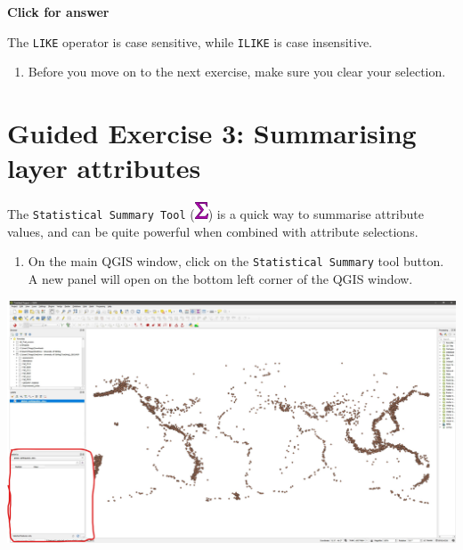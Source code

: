 \documentclass[
  letterpaper,
  DIV=11,
  numbers=noendperiod]{scrreprt}
\providecommand{\tightlist}{%
  \setlength{\itemsep}{0pt}\setlength{\parskip}{0pt}}\usepackage{longtable,booktabs,array}
\begin{document}
\begin{tcolorbox}[enhanced jigsaw, toprule=.15mm, breakable, left=2mm, colframe=quarto-callout-important-color-frame, colback=white, arc=.35mm, leftrule=.75mm, opacityback=0, rightrule=.15mm, bottomrule=.15mm]

\vspace{-3mm}\textbf{Click for answer}\vspace{3mm}

The \texttt{LIKE} operator is case sensitive, while \texttt{ILIKE} is
case insensitive.

\end{tcolorbox}

\begin{enumerate}
\def\labelenumi{(\arabic{enumi})}
\setcounter{enumi}{90}
\tightlist
\item
  Before you move on to the next exercise, make sure you clear your
  selection.
\end{enumerate}

\section{Guided Exercise 3: Summarising layer
attributes}\label{guided-exercise-3-summarising-layer-attributes}

The \texttt{Statistical\ Summary\ Tool}
(\includegraphics{index_files/mediabag/mActionSum.png}) is a quick way
to summarise attribute values, and can be quite powerful when combined
with attribute selections.

\begin{enumerate}
\def\labelenumi{(\arabic{enumi})}
\setcounter{enumi}{91}
\tightlist
\item
  On the main QGIS window, click on the \texttt{Statistical\ Summary}
  tool button. A new panel will open on the bottom left corner of the
  QGIS window.
\end{enumerate}

\includegraphics{images/lab_3/lab3_fig4_summ_panel.jpg}
\end{document}
